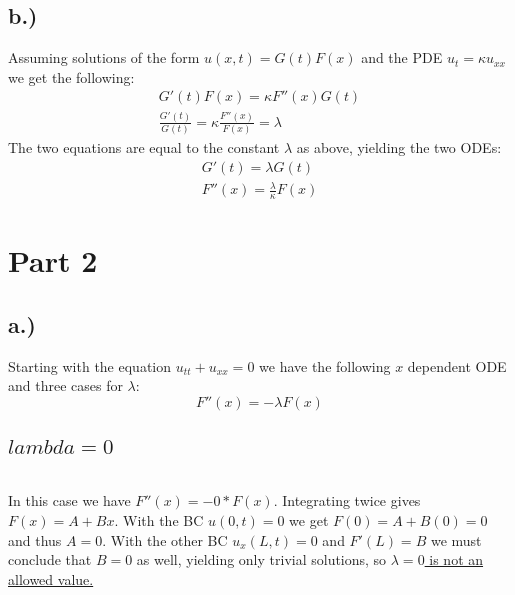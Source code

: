 \documentclass{article}
\begin{document}
\subsection*{b.)}
Assuming solutions of the form $u(x,t) = G(t)F(x)$ and the PDE $u_t = \kappa u_{xx}$ we get the following:
\begin{equation}
\begin{aligned}
G'(t)F(x) = \kappa F''(x)G(t)\\
\frac{G'(t)}{G(t)} = \kappa \frac{F''(x)}{F(x)} = \lambda
\end{aligned}
\end{equation}
The two equations are equal to the constant $\lambda $ as above, yielding the two ODEs:
\begin{equation}
\begin{aligned}
G'(t) = \lambda G(t)\\
F''(x) = \frac{\lambda}{\kappa} F(x)
\end{aligned}
\end{equation}
\section*{Part 2}
\subsection*{a.)}
Starting with the equation $u_{tt} + u_{xx} = 0$ we have the following $x$ dependent ODE and three cases for $\lambda$:
\begin{equation}
F''(x) = -\lambda F(x)
\end{equation}
\subsection*{$lambda = 0$}~\newline 
\\
In this case we have $F''(x) = - 0 * F(x)$. Integrating twice gives $F(x) = A + Bx$. With the BC $u(0,t) = 0$ we get $F(0) = A + B(0) = 0$ and thus $A = 0$. With the other BC $u_x(L,t) = 0$ and $F'(L) = B$ we must conclude that $B=0$ as well, yielding only trivial solutions, so \underline{$\lambda = 0$ is not an allowed value.}
\end{document}
